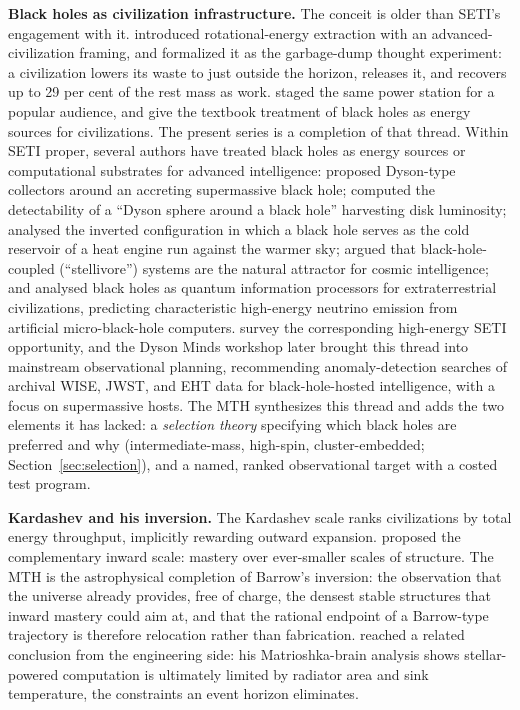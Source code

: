 \documentclass[11pt]{article}
\begin{document}
\textbf{Black holes as civilization infrastructure.} The conceit is older than SETI's engagement with it. \citet{Penrose1969} introduced rotational-energy extraction with an advanced-civilization framing, and \citet[\S 33.7]{MTW1973} formalized it as the garbage-dump thought experiment: a civilization lowers its waste to just outside the horizon, releases it, and recovers up to 29 per cent of the rest mass as work. \citet{Thorne1994} staged the same power station for a popular audience, and \citet[\S 12]{FrolovNovikov1998} give the textbook treatment of black holes as energy sources for civilizations. The present series is a completion of that thread. Within SETI proper, several authors have treated black holes as energy sources or computational substrates for advanced intelligence: \citet{Inoue2011} proposed Dyson-type collectors around an accreting supermassive black hole; \citet{Hsiao2021} computed the detectability of a ``Dyson sphere around a black hole'' harvesting disk luminosity; \citet{Opatrny2017} analysed the inverted configuration in which a black hole serves as the cold reservoir of a heat engine run against the warmer sky; \citet{Vidal2011,Vidal2014} argued that black-hole-coupled (``stellivore'') systems are the natural attractor for cosmic intelligence; and \citet{Dvali2023} analysed black holes as quantum information processors for extraterrestrial civilizations, predicting characteristic high-energy neutrino emission from artificial micro-black-hole computers. \citet{Lacki2025} survey the corresponding high-energy SETI opportunity, and the Dyson Minds workshop \citep{Curtis2026DysonMinds} later brought this thread into mainstream observational planning, recommending anomaly-detection searches of archival WISE, JWST, and EHT data for black-hole-hosted intelligence, with a focus on supermassive hosts. The MTH synthesizes this thread and adds the two elements it has lacked: a \emph{selection theory} specifying which black holes are preferred and why (intermediate-mass, high-spin, cluster-embedded; Section~\ref{sec:selection}), and a named, ranked observational target with a costed test program.

\textbf{Kardashev and his inversion.} The Kardashev scale \citep{Kardashev1964} ranks civilizations by total energy throughput, implicitly rewarding outward expansion. \citet{Barrow1998} proposed the complementary inward scale: mastery over ever-smaller scales of structure. The MTH is the astrophysical completion of Barrow's inversion: the observation that the universe already provides, free of charge, the densest stable structures that inward mastery could aim at, and that the rational endpoint of a Barrow-type trajectory is therefore relocation rather than fabrication. \citet{Bradbury1999} reached a related conclusion from the engineering side: his Matrioshka-brain analysis shows stellar-powered computation is ultimately limited by radiator area and sink temperature, the constraints an event horizon eliminates.
\end{document}
